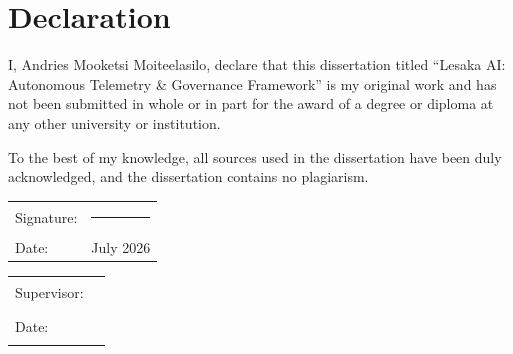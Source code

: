 
\chapter*{Declaration}

I, Andries Mooketsi Moiteelasilo, declare that this dissertation titled ``Lesaka AI: Autonomous Telemetry \& Governance Framework'' is my original work and has not been submitted in whole or in part for the award of a degree or diploma at any other university or institution.

To the best of my knowledge, all sources used in the dissertation have been duly acknowledged, and the dissertation contains no plagiarism.

\vspace{2cm}

\begin{tabular}{@{}p{}@{}p{}}
Signature: & \rule{6cm}{0.5pt} \\
Date: & July 2026 \\
\end{tabular}

\vspace{2cm}

\begin{tabular}{@{}p{}@{}p{}}
Supervisor: & \rule{6cm}{0.5pt} \\
Date: & \rule{6cm}{0.5pt} \\
\end{tabular}
